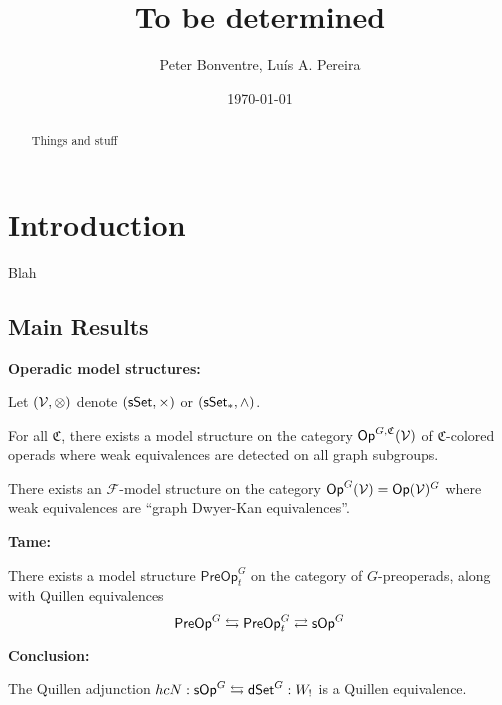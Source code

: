\documentclass[a4paper,10pt
]{article}%
\title{To be determined}%
\author{Peter Bonventre, Lu\'is A. Pereira}%
\date{\today}
\renewcommand{\F}{\mathcal F}
\renewcommand{\1}{\ensuremath{\mathbb{id}}}
\begin{document}
\maketitle

\begin{abstract}
      Things and stuff
\end{abstract}

\tableofcontents


\section{Introduction}

Blah

\subsection{Main Results}

\textbf{Operadic model structures:}

Let $(\mathcal V, \otimes)$ denote $(\mathsf{sSet}, \times)$ or $(\sSet_{\**}, \wedge)$.

\begin{theorem}
      For all $\mathfrak C$, there exists a model structure on the category $\mathsf{Op}^{G, \mathfrak C}(\mathcal V)$ of
      $\mathfrak C$-colored operads where weak equivalences are detected on all graph subgroups.
\end{theorem}

\begin{theorem}
      There exists an $\F$-model structure on the category $\mathsf{Op}^G(\mathcal V) = \mathsf{Op}(\mathcal V)^G$
      where weak equivalences are ``graph Dwyer-Kan equivalences''.
\end{theorem}

\textbf{Tame:}

\begin{theorem}
      There exists a model structure $\mathsf{PreOp}^G_t$ on the category of $G$-preoperads,
      along with Quillen equivalences
      \begin{equation}
            \mathsf{PreOp}^G \leftrightarrows \mathsf{PreOp}^G_t \rightleftarrows \mathsf{sOp}^G
      \end{equation}
\end{theorem}

\textbf{Conclusion:}

\begin{theorem}
      The Quillen adjunction $h c N: \mathsf{sOp}^G \leftrightarrows \mathsf{dSet}^G : W_!$ is a Quillen equivalence.
\end{theorem}
\end{document}
